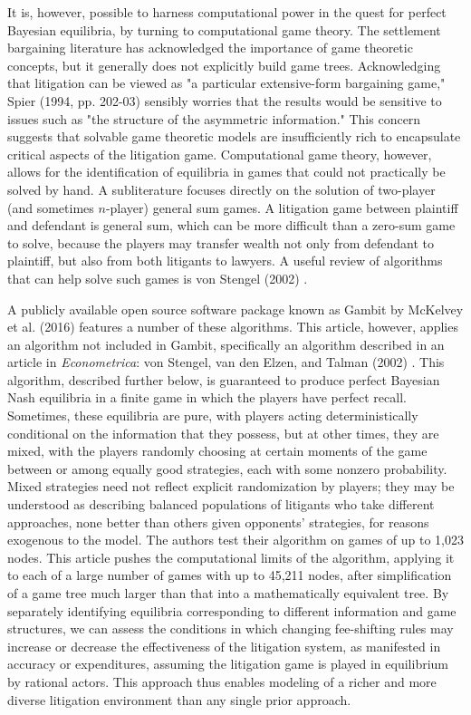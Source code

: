 \documentclass{article}
\begin{document}
It is, however, possible to harness computational power in the quest for perfect Bayesian equilibria, by turning to computational game theory. The settlement bargaining literature has acknowledged the importance of game theoretic concepts, but it generally does not explicitly build game trees. Acknowledging that litigation can be viewed as "a particular extensive-form bargaining game," Spier (1994, pp. 202-03) \cite{spier} sensibly worries that the results would be sensitive to issues such as "the structure of the asymmetric information." This concern suggests that solvable game theoretic models are insufficiently rich to encapsulate critical aspects of the litigation game. Computational game theory, however, allows for the identification of equilibria in games that could not practically be solved by hand. A subliterature focuses directly on the solution of two-player (and sometimes $n$-player) general sum games. A litigation game between plaintiff and defendant is general sum, which can be more difficult than a zero-sum game to solve, because the players may transfer wealth not only from defendant to plaintiff, but also from both litigants to lawyers. A useful review of algorithms that can help solve such games is von Stengel (2002) \cite{vonstengel2002}.

A publicly available open source software package known as Gambit by McKelvey et al. (2016) \cite{mckelvey} features a number of these algorithms. This article, however, applies an algorithm not included in Gambit, specifically an algorithm described in an article in \textit{Econometrica}: von Stengel, van den Elzen, and Talman (2002) \cite{vonstengelvandenelzentalman}. This algorithm, described further below, is guaranteed to produce perfect Bayesian Nash equilibria in a finite game in which the players have perfect recall. Sometimes, these equilibria are pure, with players acting deterministically conditional on the information that they possess, but at other times, they are mixed, with the players randomly choosing at certain moments of the game between or among equally good strategies, each with some nonzero probability. Mixed strategies need not reflect explicit randomization by players; they may be understood as describing balanced populations of litigants who take different approaches, none better than others given opponents' strategies, for reasons exogenous to the model. The authors test their algorithm on games of up to 1,023 nodes. This article pushes the computational limits of the algorithm, applying it to each of a large number of games with up to 45,211 nodes, after simplification of a game tree much larger than that into a mathematically equivalent tree. By separately identifying equilibria corresponding to different information and game structures, we can assess the conditions in which changing fee-shifting rules may increase or decrease the effectiveness of the litigation system, as manifested in accuracy or expenditures, assuming the litigation game is played in equilibrium by rational actors. This approach thus enables modeling of a richer and more diverse litigation environment than any single prior approach.
\end{document}
